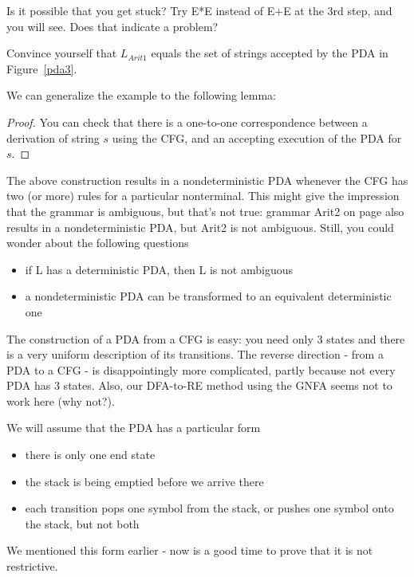 Is it possible that you get stuck? Try E*E instead of E$+$E at the 3rd
step, and you will see. Does that indicate a problem?

Convince yourself that $L_{Arit1}$ equals the set of strings accepted
by the PDA in Figure~\ref{pda3}.

We can generalize the example to the following lemma:

{}
\begin{proof}
You can check that there is a one-to-one correspondence between a
derivation of string $s$ using the CFG, and an accepting execution of the PDA for $s$.
\end{proof}

The above construction results in a nondeterministic PDA whenever the
CFG has two (or more) rules for a particular nonterminal. This might
give the impression that the grammar is ambiguous, but that's not true: grammar
Arit2 on page \pageref{arit2label} also results in a nondeterministic
PDA, but Arit2 is not ambiguous. Still, you could wonder about the
following questions
\begin{itemize}
\item
if L has a deterministic PDA, then L is not ambiguous
\item
a nondeterministic PDA can be transformed to an equivalent
deterministic one
\end{itemize}


The construction of a PDA from a CFG is easy: you need only 3
states and there is a very uniform description of its transitions.
The reverse direction - from a PDA to a CFG - is disappointingly more
complicated, partly because not every PDA has 3 states. Also, our
DFA-to-RE method using the GNFA seems not to work here (why not?).

\clearpage
We will assume that the PDA has a particular form
\begin{itemize}
\item there is only one end state
\item the stack is being emptied before we arrive there
\item each transition pops one symbol from the stack, or pushes one
  symbol onto the stack, but not both
\end{itemize}
We mentioned this form earlier - now is a good time to prove that it
is not restrictive.


